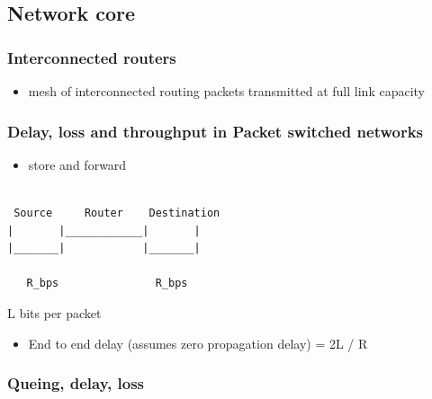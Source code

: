 \documentclass[11pt]{article}
\begin{document}
\subsection{Network core}
\label{sec:org9292399}
\subsubsection{Interconnected routers}
\label{sec:org7dc99e4}
\begin{itemize}
\item mesh of interconnected routing packets transmitted at full link
capacity
\end{itemize}

\subsubsection{Delay, loss and throughput in Packet switched networks}
\label{sec:org6ce6f21}

\begin{itemize}
\item store and forward
\end{itemize}


\begin{verbatim}

 Source     Router    Destination
|       |____________|       |
|_______|            |_______|

   R_bps               R_bps
\end{verbatim}

L bits per packet

\begin{itemize}
\item End to end delay (assumes zero propagation delay) = 2L / R
\end{itemize}

\subsubsection{Queing, delay, loss}
\label{sec:orgaab187d}
\end{document}
